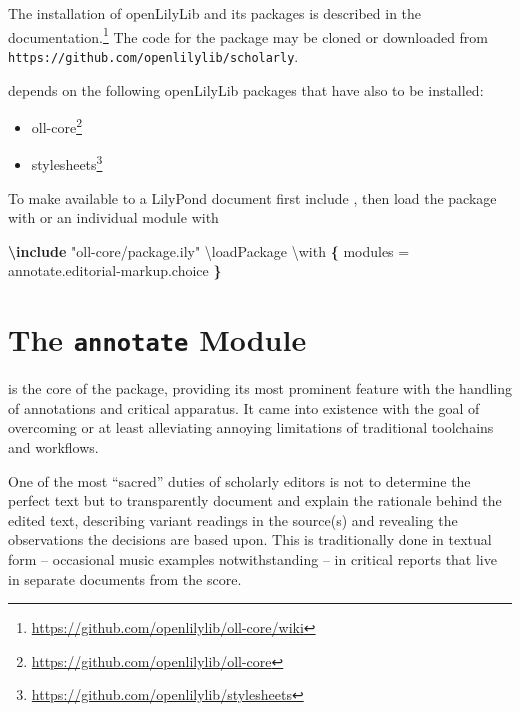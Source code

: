 \documentclass[]{ollmanual}
\newenvironment{Shaded}{}{}
\newcommand{\FunctionTok}[1]{\textcolor[rgb]{0.02,0.16,0.49}{#1}}
\newcommand{\KeywordTok}[1]{\textcolor[rgb]{0.00,0.44,0.13}{\textbf{#1}}}
\newcommand{\NormalTok}[1]{#1}
\newcommand{\StringTok}[1]{\textcolor[rgb]{0.25,0.44,0.63}{#1}}
\providecommand{\tightlist}{%
  \setlength{\itemsep}{0pt}\setlength{\parskip}{0pt}}
\begin{document}
The installation of openLilyLib and its packages is described in the
 documentation.\footnote{\url{https://github.com/openlilylib/oll-core/wiki}}
The code for the  package may be cloned or
downloaded from \texttt{https://github.com/openlilylib/scholarly}.

 depends on the following openLilyLib packages
that have also to be installed:

\begin{itemize}
\tightlist
\item
  oll-core\footnote{\url{https://github.com/openlilylib/oll-core}}
\item
  stylesheets\footnote{\url{https://github.com/openlilylib/stylesheets}}
\end{itemize}

To make  available to a LilyPond document first
include , then load the package with
 or an individual module with 

\begin{Shaded}
\begin{Highlighting}[]
\KeywordTok{\textbackslash{}include}\NormalTok{ "}\StringTok{oll-core/package.ily"}
\FunctionTok{\textbackslash{}loadPackage}\NormalTok{ \textbackslash{}with}\KeywordTok{ \{}
\NormalTok{  modules = annotate.editorial-markup.choice}
\KeywordTok{\}}
\end{Highlighting}
\end{Shaded}

\hypertarget{the-annotate-module}{%
\section{\texorpdfstring{The \texttt{annotate}
Module}{The annotate Module}}\label{the-annotate-module}}

 is the core of the
 package, providing its most prominent feature
with the handling of annotations and critical apparatus. It came into
existence with the goal of overcoming or at least alleviating annoying
limitations of traditional toolchains and workflows.

One of the most ``sacred'' duties of scholarly editors is not to
determine the perfect text but to transparently document and explain the
rationale behind the edited text, describing variant readings in the
source(s) and revealing the observations the decisions are based upon.
This is traditionally done in textual form -- occasional music examples
notwithstanding -- in critical reports that live in separate documents
from the score.
\end{document}
